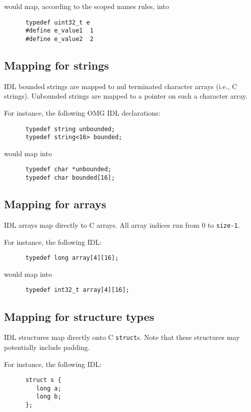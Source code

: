would map, according to the scoped names rules, into
\begin{verbatim}
      typedef uint32_t e
      #define e_value1  1
      #define e_value2  2
\end{verbatim}


\subsection{Mapping for strings}

\GenoM{}  IDL bounded  strings are  mapped to  nul terminated  character arrays
(i.e., C strings). Unbounded strings are mapped to a pointer on such a
character array.

For instance, the following OMG IDL declarations:
\begin{verbatim}
      typedef string unbounded;
      typedef string<16> bounded;
\end{verbatim}

would map into
\begin{verbatim}
      typedef char *unbounded;
      typedef char bounded[16];
\end{verbatim}


\subsection{Mapping for arrays}

\GenoM{} IDL arrays map directly to C arrays. All array indices run from 0 to
{\tt size-1}.

For instance, the following IDL:
\begin{verbatim}
      typedef long array[4][16];
\end{verbatim}

would map into
\begin{verbatim}
      typedef int32_t array[4][16];
\end{verbatim}


\subsection{Mapping for structure types}

\GenoM{}  IDL structures map  directly onto  C {\tt  struct}s. Note  that these
structures  may  potentially  include  padding.

For instance, the following IDL:
\begin{verbatim}
      struct s {
         long a;
         long b;
      };
\end{verbatim}


